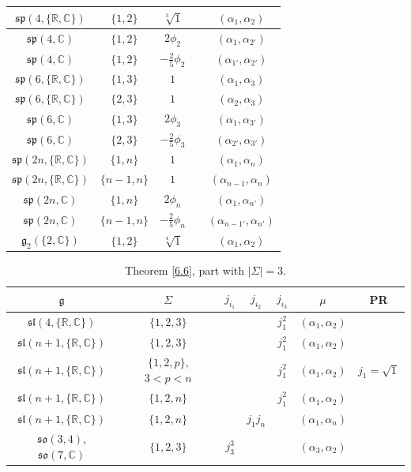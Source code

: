 \documentclass[pdftex]{sigma}
\newcommand{\Si}{\Sigma}
\newcommand{\fg}{\mathfrak g}
\newcommand{\C}{\mathbb{C}}
\numberwithin{equation}{section}
\begin{document}
\begin{table}[th!]
\begin{tabular}{|c|c|c|c|c|}
\hline
$\mathfrak{sp}(4,\{\mathbb{R, C}\})$& $\{1,2\}$ &$\sqrt[3]{1}$&& $(\alpha_1,\alpha_2)$ \\
\hline
$\mathfrak{sp}(4,\mathbb{C})$ & $\{1,2\}$&$2\phi_2$& & $(\alpha_{1},\alpha_{2'})$ \\
\hline
$\mathfrak{sp}(4,\mathbb{C})$ & $\{1,2\}$&$-\frac25\phi_2$&& $(\alpha_{1'},\alpha_{2'})$ \\
\hline
$\mathfrak{sp}(6,\{\mathbb{R, C}\})$& $\{1,3\}$ &$1$&& $(\alpha_1,\alpha_3)$ \\
\hline
$\mathfrak{sp}(6,\{\mathbb{R, C}\})$& $\{2,3\}$&$1$&& $(\alpha_{2},\alpha_3)$ \\
\hline
$\mathfrak{sp}(6,\mathbb{C})$ & $\{1,3\}$&$2\phi_3$& & $(\alpha_{1},\alpha_{3'})$ \\
\hline
$\mathfrak{sp}(6,\mathbb{C})$ & $\{2,3\}$&$-\frac25\phi_3$&& $(\alpha_{2'},\alpha_{3'})$ \\
\hline
$\mathfrak{sp}(2n,\{\mathbb{R, C}\})$& $\{1,n\}$ &$1$&& $(\alpha_1,\alpha_n)$ \\
\hline
$\mathfrak{sp}(2n,\{\mathbb{R, C}\})$& $\{n-1,n\}$&$1$&& $(\alpha_{n-1},\alpha_n)$ \\
\hline
$\mathfrak{sp}(2n,\mathbb{C})$ & $\{1,n\}$&$2\phi_n$& & $(\alpha_{1},\alpha_{n'})$ \\
\hline
$\mathfrak{sp}(2n,\mathbb{C})$ & $\{n-1,n\}$&$-\frac25\phi_n$&& $(\alpha_{n-1'},\alpha_{n'})$ \\
\hline
$\mathfrak{g}_2(\{2,\C\})$ & $\{1,2\}$ & $\sqrt[4]{1}$ && $(\alpha_1,\alpha_2)$ \\
\hline
\end{tabular}
\end{table}

\begin{table}[th!]\centering\caption{Theorem \ref{6.6}, part with $|\Si|=3$.}\label{ahs11}\vspace{1mm}

\begin{tabular}{|c|c|c|c|c|c|c|}
\hline
$\fg$ & $\Sigma$ & $j_{i_1}$& $j_{i_2}$& $j_{i_3}$&$\mu$&PR \\
\hline
\hline
$\mathfrak{sl}(4,\{\mathbb{R, C}\})$ &$\{1,2,3\}$ &&&$j_1^2$&$(\alpha_1,\alpha_2)$ & \\
\hline
$\mathfrak{sl}(n+1,\{\mathbb{R, C}\})$ &$\{1,2,3\}$ &&&$j_1^2$&$(\alpha_1,\alpha_2)$ & \\
\hline
$\mathfrak{sl}(n+1,\{\mathbb{R, C}\})$ &$\{1,2,p\}$, $3<p<n$ &&&$j_1^2$&$(\alpha_1,\alpha_2)$ & $j_1=\sqrt{1}$ \\
\hline
$\mathfrak{sl}(n+1,\{\mathbb{R, C}\})$ &$\{1,2,n\}$ &&&$j_1^2$&$(\alpha_1,\alpha_2)$ &\\
\hline
$\mathfrak{sl}(n+1,\{\mathbb{R, C}\})$&$\{1,2,n\}$ && $j_1j_n$& &$(\alpha_1,\alpha_n)$& \\
\hline
$\mathfrak{so}(3,4)$, $\mathfrak{so}(7,\mathbb{C})$&$\{1,2,3\}$& $j_3^3 $&&&$(\alpha_3,\alpha_2)$& \\
\hline
\end{tabular}
\end{table}
\end{document}
